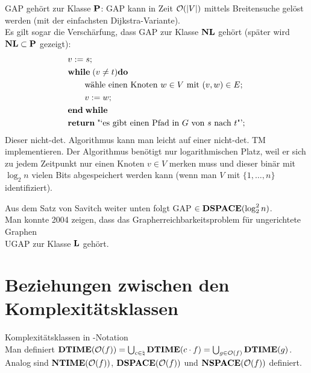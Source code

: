 \begin{Bem}
    GAP gehört zur Klasse $\P$:
    GAP kann in Zeit $\O(|V|)$ mittels Breitensuche gelöst werden
    (mit der einfachsten Dijkstra-Variante).\\
    Es gilt sogar die Verschärfung, dass GAP zur Klasse $\NL$ gehört
    (später wird $\NL \subset \P$ gezeigt):
    \begin{align*}&
        v := s;\\&
        \WHILE (v \not= t) \DO\\&
        \qquad \text{wähle einen Knoten } w \in V \text{ mit } (v, w) \in E;\\&
        \qquad v := w;\\&
        \END\WHILE\\&
        \RETURN \text{"`es gibt einen Pfad in } G \text{ von } s \text{ nach } t \text{"'};
    \end{align*}
    Dieser nicht-det. Algorithmus kann man leicht auf einer nicht-det. TM implementieren.
    Der Algorithmus benötigt nur logarithmischen Platz, weil er sich zu jedem Zeitpunkt
    nur einen Knoten $v \in V$ merken muss und dieser binär mit $\log_2 n$ vielen Bits
    abgespeichert werden kann (wenn man $V$ mit $\{1, \dotsc, n\}$ identifiziert).
\end{Bem}

\begin{Bem}
    Aus dem Satz von Savitch weiter unten folgt GAP $\in \DSPACE(\log_2^2 n)$.\\
    Man konnte 2004 zeigen, dass das Grapherreichbarkeitsproblem für ungerichtete Graphen\\
    UGAP zur Klasse $\L$ gehört.
\end{Bem}

\section{%
    Beziehungen zwischen den Komplexitätsklassen%
}

\begin{Def}{Komplexitätsklassen in -Notation}\\
    Man definiert $\DTIME(\O(f)) = \bigcup_{c \in \natural} \DTIME(c \cdot f) =
    \bigcup_{g \in \O(f)} \DTIME(g)$.\\
    Analog sind $\NTIME(\O(f))$, $\DSPACE(\O(f))$ und $\NSPACE(\O(f))$ definiert.
\end{Def}

